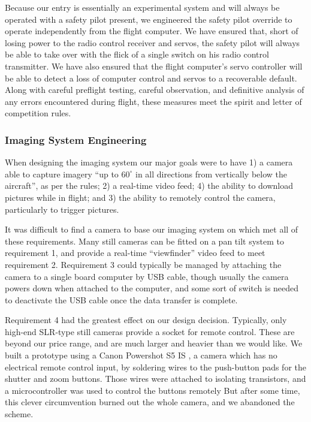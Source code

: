 \documentclass[10pt]{report}
\newcommand{\degrees}[1]
{
\begin{math}
#1^{\circ} 
\end{math}
}
\begin{document}
Because our entry is essentially an experimental system and will always be operated with a safety pilot present, we engineered the safety pilot override to operate independently from the flight computer. We have ensured that, short of losing power to the radio control receiver and servos, the safety pilot will always be able to take over with the flick of a single switch on his radio control transmitter. We have also ensured that the flight computer's servo controller will be able to detect a loss of computer control and servos to a recoverable default. Along with careful preflight testing, careful observation, and definitive analysis of any errors encountered during flight, these measures meet the spirit and letter of competition rules.

\subsubsection{Imaging System Engineering}

When designing the imaging system our major goals were to have 
1) a camera able to capture imagery ``up to \degrees{60} in all directions from vertically below the aircraft''\cite{competition_rules}, as per the rules; 
2) a real-time video feed;
4) the ability to download pictures while in flight; and
3) the ability to remotely control the camera, particularly to trigger pictures.

It was difficult to find a camera to base our imaging system on which met all of these requirements. Many still cameras can be fitted on a pan tilt system to requirement 1, and provide a real-time ``viewfinder'' video feed to meet requirement 2. Requirement 3 could typically be managed by attaching the camera to a single board computer by USB cable, though usually the camera powers down when attached to the computer, and some sort of switch is needed to deactivate the USB cable once the data transfer is complete.

Requirement 4 had the greatest effect on our design decision. Typically, only high-end SLR-type still cameras provide a socket for remote control. These are beyond our price range, and are much larger and heavier than we would like.
We built a prototype using a Canon Powershot S5 IS \cite{powershotS5}, a camera which has no electrical remote control input, by soldering wires to the push-button pads for the shutter and zoom buttons. Those wires were attached to isolating transistors, and a microcontroller was used to control the buttons remotely But after some time, this clever circumvention burned out the whole camera, and we abandoned the scheme.
\end{document}
